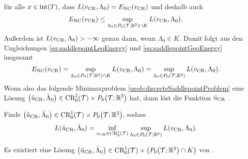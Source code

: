 für alle $x\in \operatorname{int}(T)$, dass $L(v_\textup{CR},\Lambda_0)=E_\textup{NC}(v_\textup{CR})$ und deshalb
auch
\begin{align}
  \label{eq:saddlepointGeqEnergy}
  E_\textup{NC}(v_\textup{CR})
  \leq
  \sup_{\Lambda_0\in P_0\left(\mathcal{T};\mathbb{R}^2\right)\cap K}L(v_\textup{CR},\Lambda_0).
\end{align}
Außerdem ist $L(v_\textup{CR},\Lambda_0)>-\infty$ genau dann, wenn $\Lambda_0\in K$.
Damit folgt aus den Ungleichungen \eqref{eq:saddlepointLeqEnergy} und
\eqref{eq:saddlepointGeqEnergy} insgesamt
\begin{equation*}
  \label{eq:discreteEnergySaddlefunctionalEquality}
  E_\textup{NC}(v_\textup{CR})
  =\sup_{\Lambda_0\in P_0\left(\mathcal{T};\mathbb{R}^2\right)\cap K}L(v_\textup{CR},\Lambda_0)
  =\sup_{\Lambda_0\in P_0\left(\mathcal{T};\mathbb{R}^2\right)}L(v_\textup{CR},\Lambda_0).
\end{equation*}
Wenn also das folgende Minimaxproblem
\ref{prob:discreteSaddlepointProblem} eine Lösung $\left(
\tilde{u}_{\textup{CR}},\bar\Lambda_0 \right)\in\textup{CR}^1_0(\mathcal{T})\times
P_0\!\left(\mathcal{T};\mathbb{R}^2\right)$ hat, dann löst die Funktion $\tilde{u}_{\textup{CR}}$
.

\begin{problem}\label{prob:discreteSaddlepointProblem}
  Finde $\left( \tilde{u}_{\textup{CR}},\bar\Lambda_0 \right)\in\textup{CR}^1_0(\mathcal{T})\times
  P_0\!\left(\mathcal{T};\mathbb{R}^2\right)$,
  sodass
  \begin{align*}
    L(\tilde{u}_{\textup{CR}},\bar\Lambda_0) 
    = 
    \inf_{v_\textup{CR}\in\textup{CR}^1_0(\mathcal{T})}\sup_{\Lambda_0\in P_0\left(\mathcal{T};\mathbb{R}^2\right)}
    L(v_\textup{CR},\Lambda_0).
  \end{align*}
\end{problem}

\begin{lemma}
  \label{lem:existenceSaddlepoint}
  Es existiert eine Lösung $\left( \tilde{u}_{\textup{CR}},\bar\Lambda_0
  \right)\in\textup{CR}^1_0(\mathcal{T})\times \left(P_0\!\left(\mathcal{T};\mathbb{R}^2\right)\cap
  K\right)$ von .
\end{lemma}

